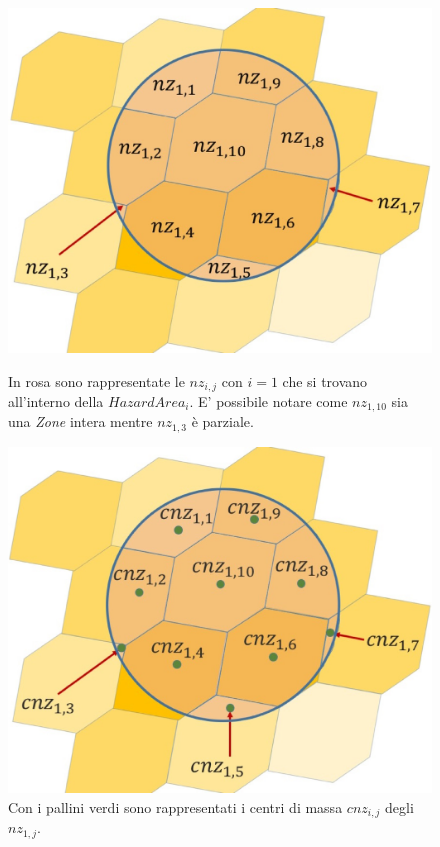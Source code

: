\begin{enumerate}
	\begin{figure}[h]
		\hspace{0.05\linewidth}
		\begin{minipage}[t]{0.45\linewidth}
			\centering
			\includegraphics[width=1\textwidth]{images/NearestZone}
			\caption{In rosa sono rappresentate le $nz_{i,j}$ con $i=1$  che si trovano all'interno della $HazardArea_i$. E' possibile notare come $nz_{1,10}$ sia una \textit{Zone} intera mentre $nz_{1,3}$ è parziale.}
			\label{NearestLand}
		\end{minipage}
		\hspace{0.05\linewidth}
		\begin{minipage}[t]{0.45\linewidth}
			\centering
			\includegraphics[width=1\textwidth]{images/cnz}
			\caption{Con i pallini verdi sono rappresentati i centri di massa $cnz_{i,j}$ degli $nz_{1,j}$.}
			\label{cnz}
		\end{minipage}
	\end{figure}
	

\end{enumerate}
